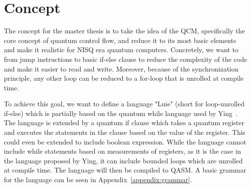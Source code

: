 \chapter{Concept}

The concept for the master thesis is to take the idea of the QCM, specifically the core concept of quantum control flow, and reduce it to its most basic elements and make it realistic for NISQ era quantum computers. Concretely, we want to from jump instructions to basic if-else clause to reduce the complexity of the code and make it easier to read and write. Moreover, because of the synchronization principle, any other loop can be reduced to a for-loop that is unrolled at compile time.

To achieve this goal, we want to define a language "Luie" (short for loop-unrolled if-else) which is partially based on the quantum while language used by Ying~\cite{Ying11}. The language is extended by a quantum if clause which takes a quantum register and executes the statements in the clause based on the value of the register. This could even be extended to include boolean expression. While the language cannot include while statements based on measurements of registers, as it is the case in the language proposed by Ying, it can include bounded loops which are unrolled at compile time. The language will then be compiled to QASM. A basic grammar for the language can be seen in Appendix~\ref{appendix:grammar}.



